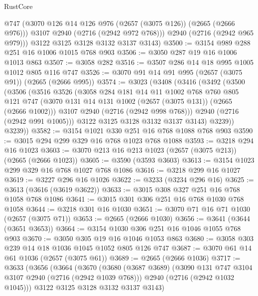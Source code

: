 \begin{lexlean}{RustCore}
\begin{coremodule}
          @747
          (@3070 @126 @14 @126 @976 (@2657 (@3075 @126)) (@2665 (@2666 @976)))
          @3107
          @2940
          (@2716 (@2942 @972 @768)))
        @2940
        (@2716 (@2942 @965 @979)))
      @3122
      @3125
      @3128
      @3132
      @3137
      @3143)
@3500 := @3154 @989 @288 @251 @16 @1006 @1015 @768 @903
@3506 := @3050 @287 @19 @16 @1006 @1013 @863
@3507 := @3058 @282
@3516 := @3507 @286 @14 @18 @995 @1005 @1012 @805 @116 @747
@3526 := @3070 @91 @14 @91 @995 (@2657 (@3075 @91)) (@2665 (@2666 @995))
@3574 := @3023
    (@3408
      (@3416
        (@3492
          (@3500
            (@3506
              (@3516
                @3526
                (@3058
                  @284
                  @181
                  @14
                  @11
                  @1002
                  @768
                  @760
                  @805
                  @121
                  @747
                  (@3070 @131 @14 @131 @1002 (@2657 (@3075 @131)) (@2665 (@2666 @1002)))
                  @3107
                  @2940
                  (@2716 (@2942 @998 @768)))
                @2940
                (@2716 (@2942 @991 @1005)))
              @3122
              @3125
              @3128
              @3132
              @3137
              @3143)
            @3239))
        @3239))
@3582 := @3154 @1021 @330 @251 @16 @768 @1088 @768 @903
@3590 := @3015 @294 @299 @329 @16 @768 @1023 @768 @1088
@3593 := @3218 @294 @16 @1023
@3603 := @3070 @213 @16 @213 @1023 (@2657 (@3075 @213)) (@2665 (@2666 @1023))
@3605 := @3590 (@3593 @3603)
@3613 := @3154 @1023 @299 @329 @16 @768 @1027 @768 @1086
@3616 := @3218 @299 @16 @1027
@3619 := @3227 @296 @16 @1026
@3622 := @3233 (@3234 @296 @16)
@3625 := @3613 (@3616 (@3619 @3622))
@3633 := @3015 @308 @327 @251 @16 @768 @1058 @768 @1086
@3641 := @3015 @301 @306 @251 @16 @768 @1030 @768 @1058
@3644 := @3218 @301 @16 @1030
@3651 := @3070 @71 @16 @71 @1030 (@2657 (@3075 @71))
@3653 := @2665 (@2666 @1030)
@3656 := @3641 (@3644 (@3651 @3653))
@3664 := @3154 @1030 @306 @251 @16 @1046 @1055 @768 @903
@3670 := @3050 @305 @19 @16 @1046 @1053 @863
@3680 := @3058 @303 @239 @14 @18 @1036 @1045 @1052 @805 @126 @747
@3687 := @3070 @61 @14 @61 @1036 (@2657 (@3075 @61))
@3689 := @2665 (@2666 @1036)
@3717 := @3633
    (@3656
      (@3664
        (@3670
          (@3680
            (@3687 @3689)
            (@3090 @131 @747 @3104 @3107 @2940 (@2716 (@2942 @1039 @768)))
            @2940
            (@2716 (@2942 @1032 @1045)))
          @3122
          @3125
          @3128
          @3132
          @3137
          @3143)

\end{coremodule}
\end{lexlean}
